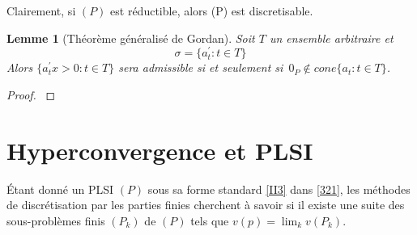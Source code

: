 \documentclass[11pt]{report}
\newenvironment{boxtheorem}
{\begin{tcolorbox}
		[enhanced jigsaw,breakable,pad at break*=2mm,
		colback=black!5,colframe=bleueLeger]}
	{\end{tcolorbox}}
\theoremstyle{styletheorem}
\newtheorem{lemma}[theoreme]{Lemme}
\theoremstyle{styledef}
\theoremstyle{remark}
\newenvironment{lemme}
{\vspace*{0.3cm}\begin{boxtheorem}\begin{lemma}}{\end{lemma}\end{boxtheorem}\vspace*{0.3cm}}
\newcommand{\ssi}{si et seulement si\  }
\begin{document}
Clairement, si $(P)$ est réductible, alors (P) est discretisable.\\



\begin{lemme}[Théorème généralisé de Gordan]
	Soit $T$ un ensemble arbitraire et $$\sigma = \lbrace a_t^\prime \colon t \in T \rbrace$$ Alors $\lbrace a_t^\prime x >0 \colon t \in T \rbrace$ sera admissible \ssi $0_P \notin cone \lbrace a_t \colon t \in T\rbrace$. 
\end{lemme}
\begin{proof}
	\cite{b15}
\end{proof}

\chapter{Hyperconvergence et PLSI}
Étant donné un PLSI $(P)$ sous sa forme standard \ref{II3} dans \ref{321}, les méthodes de discrétisation par les parties finies cherchent à savoir si il existe une suite des sous-problèmes finis $(P_k)$ de $(P)$ tels que $v(p) = \lim_k v(P_k)$.\\
\end{document}
